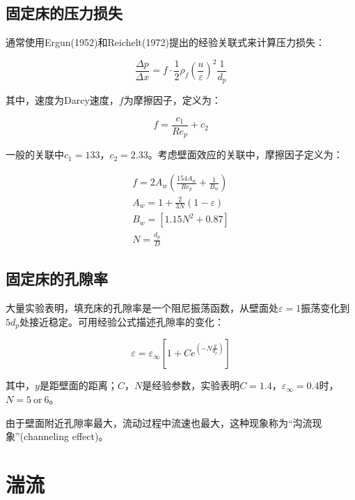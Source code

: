 \subsection{固定床的压力损失}

通常使用Ergun(1952)和Reichelt(1972)提出的经验关联式来计算压力损失：

\begin{equation}
\frac{\Delta p}{\Delta x} = f\cdot \frac{1}{2} \rho_f \left( \frac{u}{\varepsilon} \right)^2 \frac{1}{d_p}
\end{equation}

其中，速度为Darcy速度，$ f $为摩擦因子，定义为：

\begin{equation}
f = \frac{c_1}{Re_p}+c_2
\end{equation}

一般的关联中$ c_1=133 $，$ c_2=2.33 $。考虑壁面效应的关联中，摩擦因子定义为：

\begin{multline}
f = 2A_w\left( \frac{154A_w}{Re_p} + \frac{1}{B_w} \right) \\
A_w = 1+\frac{2}{3N}(1-\varepsilon) \\
B_w = \left[ 1.15N^2+0.87 \right] \\
N = \frac{d_p}{D}
\end{multline}

\subsection{固定床的孔隙率}
大量实验表明，填充床的孔隙率是一个阻尼振荡函数，从壁面处$ \varepsilon=1 $振荡变化到$ 5d_p $处接近稳定。可用经验公式描述孔隙率的变化：

\begin{equation}
\varepsilon=\varepsilon_{\infty}\left[ 1+C e^{\left(-N\frac{y}{d_p}\right)} \right]
\end{equation}

其中，$ y $是距壁面的距离；$ C $，$ N $是经验参数，实验表明$ C=1.4 $，$ \varepsilon_{\infty}=0.4 $时，$ N=5\ \text{or}\ 6 $。

由于壁面附近孔隙率最大，流动过程中流速也最大，这种现象称为“沟流现象”(channeling effect)。

\section{湍流}








